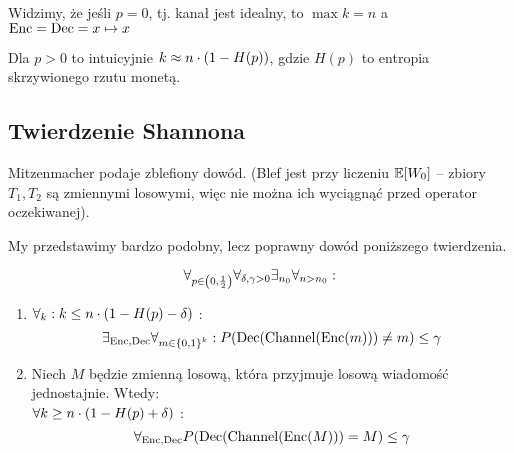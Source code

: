 Widzimy, że jeśli \( p = 0 \), tj. kanał jest idealny, to \( \max k = n \) a \( \operatorname{Enc} = \operatorname{Dec} = x \mapsto x \)

Dla \( p > 0 \) to intuicyjnie \( k \approx n \cdot \left(1 - H(p)\right) \), gdzie \( H(p) \) to entropia skrzywionego rzutu monetą. \\

\subsection{Twierdzenie Shannona}
Mitzenmacher podaje zblefiony dowód. (Blef jest przy liczeniu \(\expected{W_0}\) -- zbiory \(T_1, T_2\) są zmiennymi losowymi, więc nie można ich wyciągnąć przed operator oczekiwanej).

My przedstawimy bardzo podobny, lecz poprawny dowód poniższego twierdzenia.
\begin{theorem}
	\[
		\forall_{p \in \left(0, \frac{1}{2}\right)}
		\forall_{\delta, \gamma > 0}
		\exists_{n_0}
		\forall_{n > n_0} :
	\]
	\begin{center}
		\begin{enumerate} \centering
			\item \( \forall_k : k \leq n \cdot \left(1 - H(p) - \delta\right) \) :
			      \[
				      \exists_{\Enc, \Dec} \forall_{m \in \set{0, 1}^k} :
				      P\pars{\Dec(\Channel(\Enc(m))) \neq m} \leq \gamma
			      \]

			\item
			      Niech \( M \) będzie zmienną losową, która przyjmuje losową wiadomość jednostajnie. Wtedy: \\
			      \( \forall k \geq n \cdot \left(1 - H(p) + \delta\right) \) :
			      \[
				      \forall_{\Enc, \Dec} P\pars{\Dec(\Channel(\Enc(M))) = M} \leq \gamma
			      \]
		\end{enumerate}
	\end{center}
\end{theorem}
